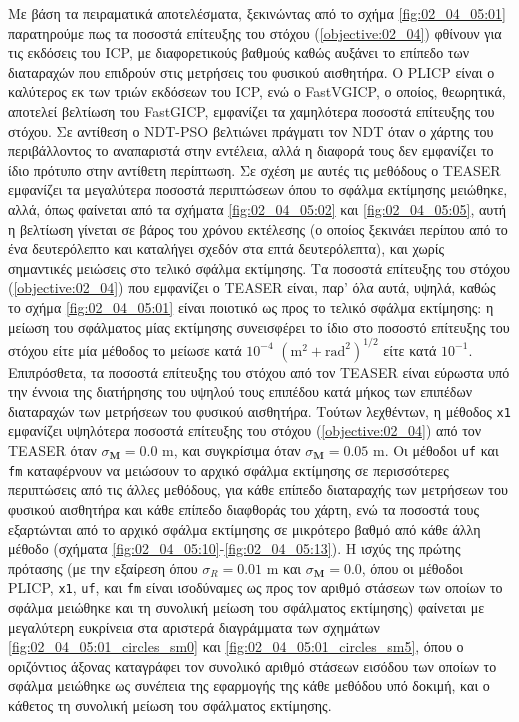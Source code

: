 Με βάση τα πειραματικά αποτελέσματα, ξεκινώντας από το σχήμα
\ref{fig:02_04_05:01} παρατηρούμε πως τα ποσοστά επίτευξης του στόχου
(\ref{objective:02_04}) φθίνουν για τις εκδόσεις του ICP, με διαφορετικούς
βαθμούς καθώς αυξάνει το επίπεδο των διαταραχών που επιδρούν στις μετρήσεις του
φυσικού αισθητήρα. Ο PLICP είναι ο καλύτερος εκ των τριών εκδόσεων του ICP, ενώ
ο FastVGICP, ο οποίος, θεωρητικά, αποτελεί βελτίωση του FastGICP, εμφανίζει τα
χαμηλότερα ποσοστά επίτευξης του στόχου.  Σε αντίθεση ο NDT-PSO βελτιώνει
πράγματι τον NDT όταν ο χάρτης του περιβάλλοντος το αναπαριστά στην εντέλεια,
αλλά η διαφορά τους δεν εμφανίζει το ίδιο πρότυπο στην αντίθετη περίπτωση. Σε
σχέση με αυτές τις μεθόδους ο TEASER εμφανίζει τα μεγαλύτερα ποσοστά
περιπτώσεων όπου το σφάλμα εκτίμησης μειώθηκε, αλλά, όπως φαίνεται από τα
σχήματα \ref{fig:02_04_05:02} και \ref{fig:02_04_05:05}, αυτή η βελτίωση
γίνεται σε βάρος του χρόνου εκτέλεσης (ο οποίος ξεκινάει περίπου από το ένα
δευτερόλεπτο και καταλήγει σχεδόν στα επτά δευτερόλεπτα), και χωρίς σημαντικές
μειώσεις στο τελικό σφάλμα εκτίμησης. Τα ποσοστά επίτευξης του στόχου
(\ref{objective:02_04}) που εμφανίζει ο TEASER είναι, παρ' όλα αυτά, υψηλά,
καθώς το σχήμα \ref{fig:02_04_05:01} είναι ποιοτικό ως προς το τελικό σφάλμα
εκτίμησης: η μείωση του σφάλματος μίας εκτίμησης συνεισφέρει το ίδιο στο
ποσοστό επίτευξης του στόχου είτε μία μέθοδος το μείωσε κατά $10^{-4}$
$(\text{m}^2 + \text{rad}^2)^{1/2}$ είτε κατά $10^{-1}$. Επιπρόσθετα, τα
ποσοστά επίτευξης του στόχου από τον TEASER είναι εύρωστα υπό την έννοια της
διατήρησης του υψηλού τους επιπέδου κατά μήκος των επιπέδων διαταραχών των
μετρήσεων του φυσικού αισθητήρα. Τούτων λεχθέντων, η μέθοδος \texttt{x1}
εμφανίζει υψηλότερα ποσοστά επίτευξης του στόχου (\ref{objective:02_04}) από
τον TEASER όταν $\sigma_{\bm{M}} = 0.0$ m, και συγκρίσιμα όταν $\sigma_{\bm{M}}
= 0.05$ m. Οι μέθοδοι \texttt{uf} και \texttt{fm} καταφέρνουν να μειώσουν το
αρχικό σφάλμα εκτίμησης σε περισσότερες περιπτώσεις από τις άλλες μεθόδους, για
κάθε επίπεδο διαταραχής των μετρήσεων του φυσικού αισθητήρα και κάθε επίπεδο
διαφθοράς του χάρτη, ενώ τα ποσοστά τους εξαρτώνται από το αρχικό σφάλμα
εκτίμησης σε μικρότερο βαθμό από κάθε άλλη μέθοδο (σχήματα
\ref{fig:02_04_05:10}-\ref{fig:02_04_05:13}). Η ισχύς της πρώτης πρότασης (με
την εξαίρεση όπου $\sigma_R = 0.01$ m και $\sigma_{\bm{M}} = 0.0$, όπου οι
μέθοδοι PLICP, \texttt{x1}, \texttt{uf}, και \texttt{fm} είναι ισοδύναμες ως
προς τον αριθμό στάσεων των οποίων το σφάλμα μειώθηκε και τη συνολική μείωση
του σφάλματος εκτίμησης) φαίνεται με μεγαλύτερη ευκρίνεια στα αριστερά
διαγράμματα των σχημάτων \ref{fig:02_04_05:01_circles_sm0} και
\ref{fig:02_04_05:01_circles_sm5}, όπου ο οριζόντιος άξονας καταγράφει τον
συνολικό αριθμό στάσεων εισόδου των οποίων το σφάλμα μειώθηκε ως συνέπεια της
εφαρμογής της κάθε μεθόδου υπό δοκιμή, και ο κάθετος τη συνολική μείωση του
σφάλματος εκτίμησης.

